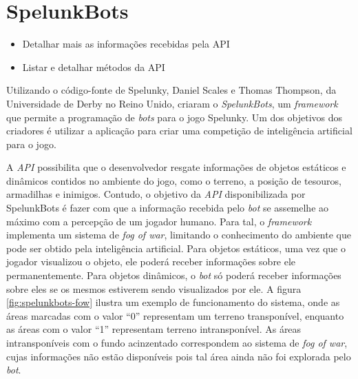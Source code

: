 \chapter{\label{chap:spelunkbots}SpelunkBots}

\begin{mdframed}[backgroundcolor=green!20]
    \begin{itemize}
        \item
            Detalhar mais as informações recebidas pela API
        \item
            Listar e detalhar métodos da API
    \end{itemize}
\end{mdframed}

Utilizando o código-fonte de Spelunky, Daniel Scales e Thomas Thompson, da
Universidade de Derby no Reino Unido, criaram o
\textit{SpelunkBots}\cite{SPELUNKBOTSPAPER}, um
\textit{framework} que permite a programação de \textit{bots} para o jogo
Spelunky. Um dos objetivos dos criadores é utilizar a aplicação para criar uma
competição de inteligência artificial para o jogo.

A \textit{API} possibilita que o desenvolvedor resgate informações de objetos
estáticos e dinâmicos contidos no ambiente do jogo, como o terreno, a
posição de tesouros, armadilhas e inimigos. Contudo, o objetivo da \textit{API}
disponibilizada por SpelunkBots é fazer com que a informação recebida pelo
\textit{bot} se assemelhe ao máximo com a percepção de um jogador humano.  Para
tal, o \textit{framework} implementa um sistema de \textit{fog of war},
limitando o conhecimento do ambiente que pode ser obtido pela inteligência
artificial. Para objetos estáticos, uma vez que o jogador visualizou o objeto,
ele poderá receber informações sobre ele permanentemente. Para objetos
dinâmicos, o \textit{bot} só poderá receber informações sobre eles se os mesmos
estiverem sendo visualizados por ele. A figura \ref{fig:spelunkbots-fow} ilustra
um exemplo de funcionamento do sistema, onde as áreas marcadas com o valor ``0''
representam um terreno transponível, enquanto as áreas com o valor ``1''
representam terreno intransponível. As áreas intransponíveis com o fundo
acinzentado correspondem ao sistema de \textit{fog of war}, cujas informações
não estão disponíveis pois tal área ainda não foi explorada pelo \textit{bot}.

